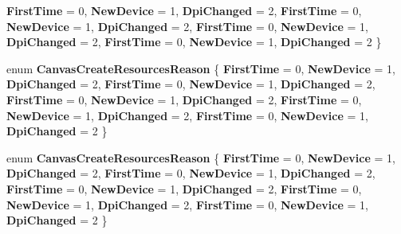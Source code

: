 \begin{DoxyCompactItemize}
{\bfseries First\+Time} = 0, 
\newline
{\bfseries New\+Device} = 1, 
{\bfseries Dpi\+Changed} = 2, 
{\bfseries First\+Time} = 0, 
{\bfseries New\+Device} = 1, 
\newline
{\bfseries Dpi\+Changed} = 2, 
{\bfseries First\+Time} = 0, 
{\bfseries New\+Device} = 1, 
{\bfseries Dpi\+Changed} = 2, 
\newline
{\bfseries First\+Time} = 0, 
{\bfseries New\+Device} = 1, 
{\bfseries Dpi\+Changed} = 2
 \}
\item 
\mbox{\label{namespace_microsoft_1_1_graphics_1_1_canvas_1_1_u_i_a0436749846ae2726b5c840ff8b5f378a}} 
enum {\bfseries Canvas\+Create\+Resources\+Reason} \{ \newline
{\bfseries First\+Time} = 0, 
{\bfseries New\+Device} = 1, 
{\bfseries Dpi\+Changed} = 2, 
{\bfseries First\+Time} = 0, 
\newline
{\bfseries New\+Device} = 1, 
{\bfseries Dpi\+Changed} = 2, 
{\bfseries First\+Time} = 0, 
{\bfseries New\+Device} = 1, 
\newline
{\bfseries Dpi\+Changed} = 2, 
{\bfseries First\+Time} = 0, 
{\bfseries New\+Device} = 1, 
{\bfseries Dpi\+Changed} = 2, 
\newline
{\bfseries First\+Time} = 0, 
{\bfseries New\+Device} = 1, 
{\bfseries Dpi\+Changed} = 2
 \}
\item 
\mbox{\label{namespace_microsoft_1_1_graphics_1_1_canvas_1_1_u_i_a0436749846ae2726b5c840ff8b5f378a}} 
enum {\bfseries Canvas\+Create\+Resources\+Reason} \{ \newline
{\bfseries First\+Time} = 0, 
{\bfseries New\+Device} = 1, 
{\bfseries Dpi\+Changed} = 2, 
{\bfseries First\+Time} = 0, 
\newline
{\bfseries New\+Device} = 1, 
{\bfseries Dpi\+Changed} = 2, 
{\bfseries First\+Time} = 0, 
{\bfseries New\+Device} = 1, 
\newline
{\bfseries Dpi\+Changed} = 2, 
{\bfseries First\+Time} = 0, 
{\bfseries New\+Device} = 1, 
{\bfseries Dpi\+Changed} = 2, 
\newline
{\bfseries First\+Time} = 0, 
{\bfseries New\+Device} = 1, 
{\bfseries Dpi\+Changed} = 2
 \}
\end{DoxyCompactItemize}
